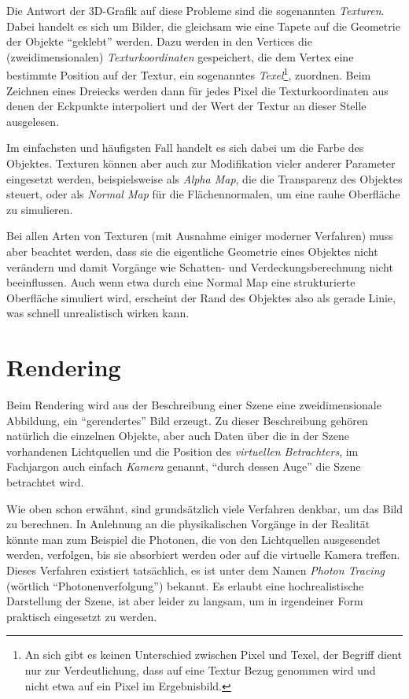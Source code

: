 Die Antwort der 3D-Grafik auf diese Probleme sind die sogenannten \emph{Texturen}. Dabei handelt es sich um Bilder, die gleichsam wie eine Tapete auf die Geometrie der Objekte \enquote{geklebt} werden. Dazu werden in den Vertices die (zweidimensionalen) \emph{Texturkoordinaten} gespeichert, die dem Vertex eine bestimmte Position auf der Textur, ein sogenanntes \emph{Texel}\footnote{An sich gibt es keinen Unterschied zwischen Pixel und Texel, der Begriff dient nur zur Verdeutlichung, dass auf eine Textur Bezug genommen wird und nicht etwa auf ein Pixel im Ergebnisbild.}, zuordnen. Beim Zeichnen eines Dreiecks werden dann für jedes Pixel die Texturkoordinaten aus denen der Eckpunkte interpoliert und der Wert der Textur an dieser Stelle ausgelesen.


Im einfachsten und häufigsten Fall handelt es sich dabei um die Farbe des Objektes. Texturen können aber auch zur Modifikation vieler anderer Parameter eingesetzt werden, beispielsweise als \emph{Alpha Map}, die die Transparenz des Objektes steuert, oder als \emph{Normal Map} für die Flächennormalen, um eine rauhe Oberfläche zu simulieren.

Bei allen Arten von Texturen (mit Ausnahme einiger moderner Verfahren) muss aber beachtet werden, dass sie die eigentliche Geometrie eines Objektes nicht verändern und damit Vorgänge wie Schatten- und Verdeckungsberechnung nicht beeinflussen. Auch wenn etwa durch eine Normal Map eine strukturierte Oberfläche simuliert wird, erscheint der Rand des Objektes also als gerade Linie, was schnell unrealistisch wirken kann.

\section{Rendering}
\label{rendering}
Beim Rendering wird aus der Beschreibung einer Szene eine zweidimensionale Abbildung, ein \enquote{gerendertes} Bild erzeugt. Zu dieser Beschreibung gehören natürlich die einzelnen Objekte, aber auch Daten über die in der Szene vorhandenen Lichtquellen und die Position des \emph{virtuellen Betrachters}, im Fachjargon auch einfach \emph{Kamera} genannt, \enquote{durch dessen Auge} die Szene betrachtet wird.

Wie oben schon erwähnt, sind grundsätzlich viele Verfahren denkbar, um das Bild zu berechnen. In Anlehnung an die physikalischen Vorgänge in der Realität könnte man zum Beispiel die Photonen, die von den Lichtquellen ausgesendet werden, verfolgen, bis sie absorbiert werden oder auf die virtuelle Kamera treffen. Dieses Verfahren existiert tatsächlich, es ist unter dem Namen \emph{Photon Tracing} (wörtlich \enquote{Photonenverfolgung}) bekannt. Es erlaubt eine hochrealistische Darstellung der Szene, ist aber leider zu langsam, um in irgendeiner Form praktisch eingesetzt zu werden.

